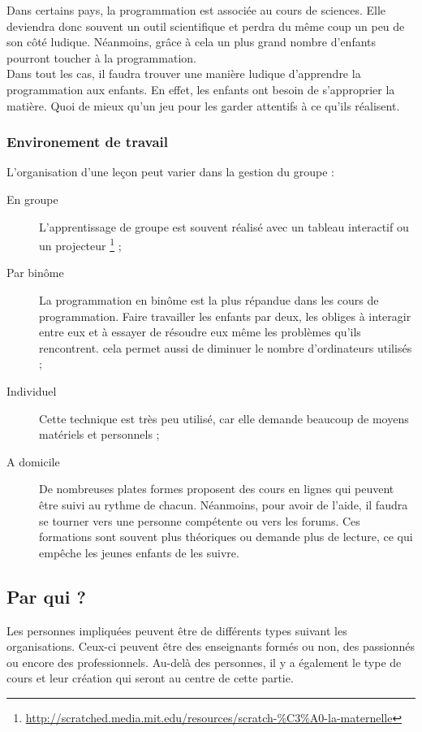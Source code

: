 Dans certains pays, la programmation est associée au cours de sciences. Elle deviendra donc souvent un outil scientifique et perdra du même coup un peu de son côté ludique. Néanmoins, grâce à cela un plus grand nombre d'enfants pourront toucher à la programmation.\\

Dans tout les cas, il faudra trouver une manière ludique d'apprendre la programmation aux enfants. En effet, les enfants ont besoin de s'approprier la matière. Quoi de mieux qu’un jeu pour les garder attentifs à ce qu'ils réalisent.

\subsubsection{Environement de travail}
\label{paire}
L'organisation d'une leçon peut varier dans la gestion du groupe :
\begin{description}
  \item[En groupe] L'apprentissage de groupe est souvent réalisé avec un tableau interactif ou un projecteur \footnote{\url{http://scratched.media.mit.edu/resources/scratch-\%C3\%A0-la-maternelle}} ;
  \item[Par binôme] La programmation en binôme est la plus répandue dans les cours de programmation. Faire travailler les enfants par deux, les obliges à interagir entre eux et à essayer de résoudre eux même les problèmes qu'ils rencontrent. cela permet aussi de diminuer le nombre d'ordinateurs utilisés ; 
  \item[Individuel] Cette technique est très peu utilisé, car elle demande beaucoup de moyens matériels et personnels ;
  \item[A domicile] De nombreuses plates formes proposent des cours en lignes qui peuvent être suivi au rythme de chacun. Néanmoins, pour avoir de l'aide, il faudra se tourner vers une personne compétente ou vers les forums. Ces formations sont souvent plus théoriques ou demande plus de lecture, ce qui empêche les jeunes enfants de les suivre.
\end{description}

\subsection{Par qui ?}
Les personnes impliquées peuvent être de différents types suivant les organisations. Ceux-ci peuvent être des enseignants formés ou non, des passionnés ou encore des professionnels. Au-delà des personnes, il y a également le type de cours et leur création qui seront au centre de cette partie.

